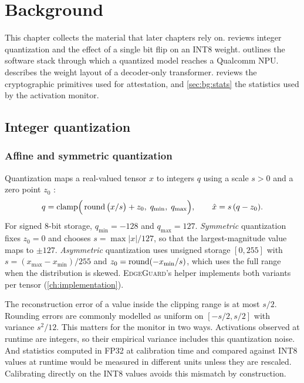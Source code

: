 \chapter{Background}
\label{ch:background}

This chapter collects the material that later chapters rely on.  reviews
integer quantization and the effect of a single bit flip on an INT8 weight.
 outlines the software stack through which a quantized model reaches a
Qualcomm NPU.  describes the weight layout of a decoder-only
transformer.  reviews the cryptographic primitives used for attestation,
and \cref{sec:bg:stats} the statistics used by the activation monitor.

\section{Integer quantization}
\label{sec:bg:quant}

\subsection{Affine and symmetric quantization}

Quantization maps a real-valued tensor $x$ to integers $q$ using a scale $s>0$ and a zero
point $z_0$ \cite{jacob2018quantization,nagel2021whitepaper}:
\begin{equation}
  q = \operatorname{clamp}\!\Big(\operatorname{round}\big(x/s\big) + z_0,\; q_{\min},\; q_{\max}\Big),
  \qquad \hat x = s\,(q - z_0).
  \label{eq:affine}
\end{equation}
For signed 8-bit storage, $q_{\min}=-128$ and $q_{\max}=127$. \emph{Symmetric} quantization
fixes $z_0=0$ and chooses $s = \max|x| / 127$, so that the largest-magnitude value maps to
$\pm127$. \emph{Asymmetric} quantization uses unsigned storage $[0,255]$ with
$s=(x_{\max}-x_{\min})/255$ and $z_0 = \operatorname{round}(-x_{\min}/s)$, which uses the full range
when the distribution is skewed. \textsc{EdgeGuard}'s helper 
implements both variants per tensor (\cref{ch:implementation}).

The reconstruction error of a value inside the clipping range is at most $s/2$. Rounding errors
are commonly modelled as uniform on $[-s/2,s/2]$ with variance $s^2/12$. This matters for the
monitor in two ways. Activations observed at runtime are integers, so their empirical variance
includes this quantization noise. And statistics computed in FP32 at calibration time and
compared against INT8 values at runtime would be measured in different units unless they are
rescaled. Calibrating directly on the INT8 values avoids this mismatch by construction.

